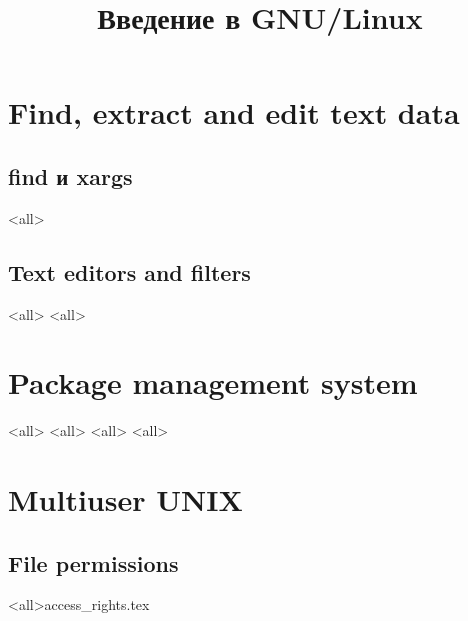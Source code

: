 

\title{Введение в GNU/Linux}








\begin{frame}
	\frametitle{}
	\titlepage
	\vspace{-0.5cm}
	\begin{center}
	\end{center}
\end{frame}





\section{Find, extract and edit text data}

\subsection{find и xargs}
\mode<all>{}
\subsection{Text editors and filters}
\mode<all>{}
\mode<all>{}

\section{Package management system}
\mode<all>{}
\mode<all>{}
\mode<all>{}
\mode<all>{}

\section{Multiuser UNIX}
\subsection{File permissions}
\mode<all>{{access_rights.tex}}
